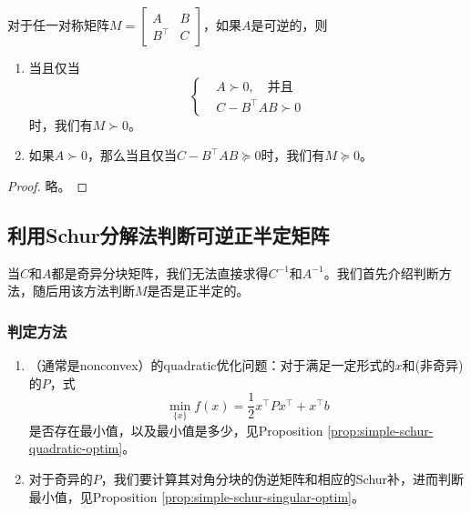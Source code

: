 \begin{subappendices}
\begin{proposition}
  对于任一对称矩阵$M = \begin{bmatrix}
  A & B \\ B^{\top} & C \end{bmatrix} $，如果$A$是可逆的，则
\begin{enumerate}
  \item 当且仅当\begin{equation*}
  \begin{cases}
    &A \succ 0, \quad \text{并且}\\
    &C-B^{\top}AB \succ 0
  \end{cases}
  \end{equation*}时，我们有$M \succ 0$。
  \item 如果$A \succ 0$，那么当且仅当$C-B^{\top}AB \succeq 0$时，我们有$M \succeq 0$。
\end{enumerate}
\end{proposition}
\begin{proof}
  略。
\end{proof}

\subsection{利用Schur分解法判断可逆正半定矩阵}

当$C$和$A$都是奇异分块矩阵，我们无法直接求得$C^{-1}$和$A^{-1}$。我们首先介绍判断方法，随后用该方法判断$M$是否是正半定的。
\subsubsection{判定方法}

\begin{enumerate}
  \item （通常是nonconvex）的quadratic优化问题：对于满足一定形式的$x$和(非奇异)的$P$，式
  \begin{equation*}
    \min_{\{x\}} f(x) = \frac{1}{2} x^{\top} P x^{\top} + x^{\top} b
  \end{equation*}
  是否存在最小值，以及最小值是多少，见Proposition \ref{prop:simple-schur-quadratic-optim}。
  \item 对于奇异的$P$，我们要计算其对角分块的伪逆矩阵和相应的Schur补，进而判断最小值，见Proposition \ref{prop:simple-schur-singular-optim}。
\end{enumerate}


\end{subappendices}
